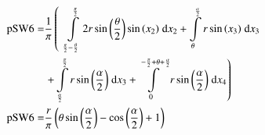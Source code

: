 \begin{align}
    \mathrm{pSW6} =&\frac{1}{\pi} \left(\;\;\int\limits_{\frac{\pi}{2} - \frac{\theta}{2}}^{\frac{\pi}{2}}2 r \sin{\left (\frac{\theta}{2} \right )} \sin{\left (x_{2} \right )}\;\mathrm{d}x_{2}+\int\limits_{\theta}^{\frac{\alpha}{2}}r \sin{\left (x_{3} \right )}\;\mathrm{d}x_{3}\right.\notag\\
 &\left.+\int\limits_{\frac{\alpha}{2}}^{\frac{\pi}{2}}r \sin{\left (\frac{\alpha}{2} \right )}\;\mathrm{d}x_{3}+\int\limits_{0}^{- \frac{\pi}{2} + \theta + \frac{\alpha}{2}}r \sin{\left (\frac{\alpha}{2} \right )}\;\mathrm{d}x_{4}\right)\label{pSW6Def}\\
    \mathrm{pSW6} =& \frac{r}{\pi} \left(\theta \sin{\left (\frac{\alpha}{2} \right )} - \cos{\left (\frac{\alpha}{2} \right )} + 1\right)\label{pSW6Sln}
\end{align}